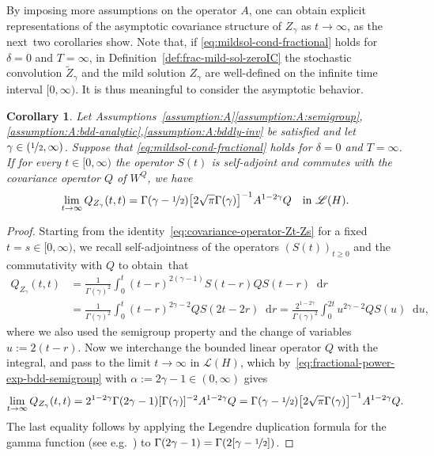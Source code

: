 \documentclass[reqno]{amsart}
\numberwithin{equation}{section}
\newcommand{\rd}{\mathop{}\!\mathrm{d}}
\newtheorem{corollary}[lemma]{Corollary}
\theoremstyle{remark}
\theoremstyle{definition}
\begin{document}
%
By imposing more assumptions  
on the operator $A$, 
one can obtain explicit representations 
of the asymptotic covariance
structure of 
$Z_\gamma$ 
as $t\to\infty$, 
as the next~two corollaries show.
Note that, 
if \eqref{eq:mildsol-cond-fractional} 
holds for $\delta=0$ and $T=\infty$, 
in Definition~\ref{def:frac-mild-sol-zeroIC} 
the stochastic convolution 
$\widetilde Z_\gamma$  
and the mild solution $Z_\gamma$ 
are well-defined on 
the infinite time interval $[0,\infty)$.  
It is thus 
meaningful to consider the asymptotic behavior.  
%
\begin{corollary}\label{cor:asymptotic-marginal-spatial-covariance}
	Let 
	Assumptions~\textup{\ref{assumption:A}\ref{assumption:A:semigroup},\ref{assumption:A:bdd-analytic},\ref{assumption:A:bddly-inv}} 
	be satisfied 
	and let 
	${\gamma \in (\nicefrac{1}{2},\infty)}$. 
	Suppose that \eqref{eq:mildsol-cond-fractional} 
	holds for $\delta=0$ and $T=\infty$. 
	If for every $t \in [0,\infty)$ 
	the operator $S(t)$ is self-adjoint and commutes with
	the covariance operator 
	$Q$ of $W^Q$\!, we have  
	\[
	\lim_{t\to\infty} Q_{Z_\gamma}(t,t) 
	= 
	\Gamma(\gamma-\nicefrac{1}{2})
	\bigl[ 2\sqrt{\pi} \Gamma(\gamma) \bigr]^{-1} 
	A^{1-2\gamma} Q 
	\quad 
	\text{in }
	\mathscr L(H). 
	\]
\end{corollary}

\begin{proof}
	Starting from 
	the identity~\eqref{eq:covariance-operator-Zt-Zs}
	for a fixed $t = s \in [0,\infty)$, 
	we recall self-adjointness of the operators 
	$(S(t))_{t\geq 0}$ and 
	the commutativity with $Q$ 
	to obtain~that 
	\begin{align*}
	Q_{Z_\gamma}(t,t) 
	&= 
	\frac{1}{\Gamma(\gamma)^2}
	\int_0^t 
	(t-r)^{2(\gamma-1)} S(t-r) Q S(t-r) 
	\rd r 
	\\
	&= 
	\frac{1}{\Gamma(\gamma)^2}
	\int_0^t 
	(t-r)^{2\gamma-2} Q S(2t-2r) 
	\rd r
	=
	\frac{2^{1-2\gamma}}{\Gamma(\gamma)^2}
	\int_0^{2t} u^{2\gamma-2} Q S(u) \rd u, 
	\end{align*}
	where we also used  
	the semigroup property and 
	the change of variables ${u := 2(t-r)}$. 
	Now we interchange the bounded
	linear operator $Q$ 
	with the integral, 
	and pass to the limit $t \to \infty$
	in $\mathscr L(H)$, which 
	by~\eqref{eq:fractional-power-exp-bdd-semigroup}
	with $\alpha := 2\gamma - 1 \in (0,\infty)$ gives 
	\[
	\lim_{t\to\infty} Q_{Z_\gamma}(t,t) 
	= 
	2^{1-2\gamma}\Gamma(2\gamma-1)
	[\Gamma(\gamma)]^{-2} 
	A^{1-2\gamma} Q
	= 
	\Gamma(\gamma-\nicefrac{1}{2})
	\bigl[ 2\sqrt{\pi} \Gamma(\gamma) \bigr]^{-1}
	A^{1-2\gamma} Q.
	\] 
	The last equality follows by applying the 
	Legendre duplication formula for the gamma 
	function (see e.g.~\cite[Formula~5.5.5]{Olver2010})
	to $\Gamma(2\gamma-1) = \Gamma(2[\gamma-\nicefrac{1}{2}])$.
\end{proof}
\end{document}
